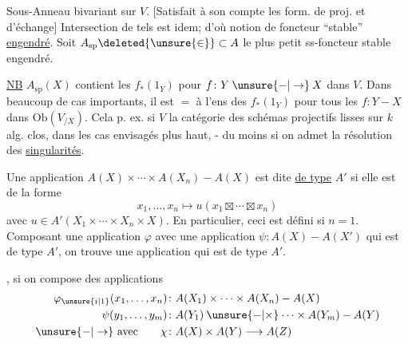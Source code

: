 

Sous-Anneau bivariant sur $V$. [Satisfait à son compte les form. de proj. et d'échange] Intersection de tels est idem; d'où notion de foncteur ``stable'' \uline{engendré}. Soit $A_{\mathrm{sp}}\deleted{\unsure{\in}}\subset A$ le plus petit ss-foncteur stable engendré.

\uline{NB} $A_{\mathrm{sp}}(X)$ contient les $f_*(1_Y)$ pour $f\colon Y\mathbin{\unsure{-|\to}}X$ dans $V$. Dans beaucoup de cas importants, il est $=$  à l'ens des $f_*(1_Y)$ pour tous les $f\colon Y\mathbin{-}X$ dans $\mathrm{Ob}(V_{/X})$. Cela  p. ex. si $V$ la catégorie des schémas projectifs lisses  sur $k$ alg. clos, dans les cas envisagés plus haut, - du moins si on admet la résolution des \uline{singularités}.

Une application $A(X)\times\cdots\times A(X_n)\mathbin{-}A(X)$ est dite \uline{de type} $A'$ si elle est de la forme
\[
 x_1,\ldots,x_n\longmapsto u(x_1\boxtimes\cdots\boxtimes x_n)
\]
avec $u\in A'(X_1\times\cdots\times X_n\times X)$. En  particulier, ceci est défini si $n=1$. Composant une  application $\varphi$ avec une application $\psi\colon A(X)\mathbin{-}A(X')$ qui est de type $A'$, on trouve une application qui est de type $A'$.

,  si on compose des applications 
\[
\begin{aligned}
 \varphi_{\unsure{i|1}}(x_1,\ldots,x_n)&\colon A(X_1)\times\cdots\times A(X_n)\mathbin{-}A(X)\\
 \psi(y_1,\ldots,y_m)&\colon A(Y_1)\mathbin{\unsure{-|\times}}\cdots\times A(Y_m)\mathbin{-}A(Y)\\
 \mathbin{\unsure{-|\to}}\ \text{avec}\qquad\chi&\colon A(X)\times A(Y)\longrightarrow A(Z)
\end{aligned}
\]
